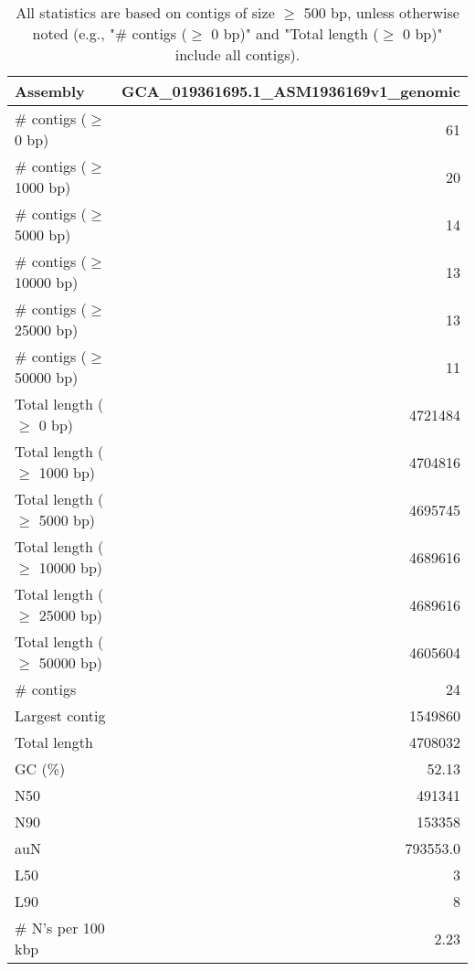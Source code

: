 \documentclass[12pt,a4paper]{article}
\begin{document}
\begin{table}[ht]
\begin{center}
\caption{All statistics are based on contigs of size $\geq$ 500 bp, unless otherwise noted (e.g., "\# contigs ($\geq$ 0 bp)" and "Total length ($\geq$ 0 bp)" include all contigs).}
\begin{tabular}{|l*{1}{|r}|}
\hline
Assembly & GCA\_019361695.1\_ASM1936169v1\_genomic \\ \hline
\# contigs ($\geq$ 0 bp) & 61 \\ \hline
\# contigs ($\geq$ 1000 bp) & 20 \\ \hline
\# contigs ($\geq$ 5000 bp) & 14 \\ \hline
\# contigs ($\geq$ 10000 bp) & 13 \\ \hline
\# contigs ($\geq$ 25000 bp) & 13 \\ \hline
\# contigs ($\geq$ 50000 bp) & 11 \\ \hline
Total length ($\geq$ 0 bp) & 4721484 \\ \hline
Total length ($\geq$ 1000 bp) & 4704816 \\ \hline
Total length ($\geq$ 5000 bp) & 4695745 \\ \hline
Total length ($\geq$ 10000 bp) & 4689616 \\ \hline
Total length ($\geq$ 25000 bp) & 4689616 \\ \hline
Total length ($\geq$ 50000 bp) & 4605604 \\ \hline
\# contigs & 24 \\ \hline
Largest contig & 1549860 \\ \hline
Total length & 4708032 \\ \hline
GC (\%) & 52.13 \\ \hline
N50 & 491341 \\ \hline
N90 & 153358 \\ \hline
auN & 793553.0 \\ \hline
L50 & 3 \\ \hline
L90 & 8 \\ \hline
\# N's per 100 kbp & 2.23 \\ \hline
\end{tabular}
\end{center}
\end{table}
\end{document}
